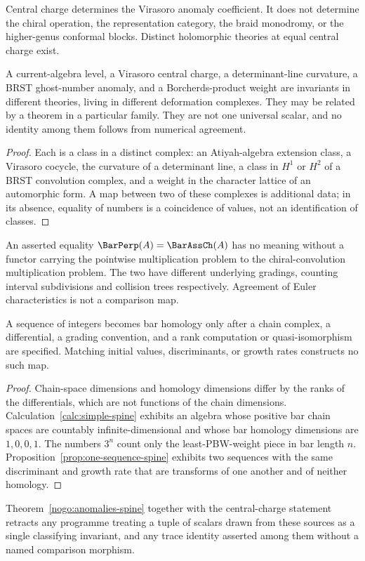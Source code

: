 \begin{theorem}
Central charge determines the Virasoro anomaly coefficient. It does not
determine the chiral operation, the representation category, the braid
monodromy, or the higher-genus conformal blocks. Distinct holomorphic theories
at equal central charge exist.
\end{theorem}

\begin{theorem}
\label{nogo:anomalies-spine}
A current-algebra level, a Virasoro central charge, a determinant-line
curvature, a BRST ghost-number anomaly, and a Borcherds-product weight are
invariants in different theories, living in different deformation complexes.
They may be related by a theorem in a particular family. They are not one
universal scalar, and no identity among them follows from numerical agreement.
\end{theorem}
\begin{proof}
Each is a class in a distinct complex: an Atiyah-algebra extension class, a
Virasoro cocycle, the curvature of a determinant line, a class in $H^1$ or
$H^2$ of a BRST convolution complex, and a weight in the character lattice of
an automorphic form. A map between two of these complexes is additional data;
in its absence, equality of numbers is a coincidence of values, not an
identification of classes.
\end{proof}

\begin{theorem}
An asserted equality $\BarPerp(A)=\BarAssCh(A)$ has no meaning without a
functor carrying the pointwise multiplication problem to the chiral-convolution
multiplication problem. The two have different underlying gradings, counting
interval subdivisions and collision trees respectively. Agreement of Euler
characteristics is not a comparison map.
\end{theorem}

\begin{theorem}
\label{nogo:scalar-spine}
A sequence of integers becomes bar homology only after a chain complex, a
differential, a grading convention, and a rank computation or quasi-isomorphism
are specified. Matching initial values, discriminants, or growth rates
constructs no such map.
\end{theorem}
\begin{proof}
Chain-space dimensions and homology dimensions differ by the ranks of the
differentials, which are not functions of the chain dimensions.
Calculation~\ref{calc:simple-spine} exhibits an algebra whose positive
bar chain spaces are countably infinite-dimensional and whose bar
homology dimensions are $1,0,0,1$.
The numbers $3^n$ count only the least-PBW-weight piece in bar length $n$.
Proposition~\ref{prop:one-sequence-spine} exhibits two sequences with the same
discriminant and growth rate that are transforms of one another and of neither
homology.
\end{proof}

Theorem~\ref{nogo:anomalies-spine} together with the central-charge statement
retracts any programme treating a tuple of scalars drawn from these sources as
a single classifying invariant, and any trace identity asserted among them
without a named comparison morphism.
